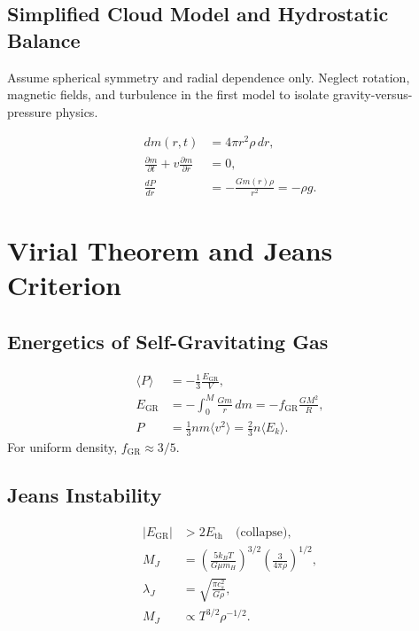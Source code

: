 \subsection{Simplified Cloud Model and Hydrostatic Balance}
\begin{foundation}
Assume spherical symmetry and radial dependence only.
Neglect rotation, magnetic fields, and turbulence in the first model to isolate gravity-versus-pressure physics.
\end{foundation}

\begin{theory}
\begin{align}
    dm(r,t) &= 4\pi r^2\rho\,dr, \\
    \frac{\partial m}{\partial t}+v\frac{\partial m}{\partial r} &= 0, \\
    \frac{dP}{dr} &= -\frac{Gm(r)\rho}{r^2} = -\rho g.
\end{align}
\end{theory}

\section{Virial Theorem and Jeans Criterion}

\subsection{Energetics of Self-Gravitating Gas}
\begin{theory}
\begin{align}
    \langle P\rangle &= -\frac{1}{3}\frac{E_{\text{GR}}}{V}, \\
    E_{\text{GR}} &= -\int_0^M \frac{Gm}{r}\,dm = -f_{\text{GR}}\frac{GM^2}{R}, \\
    P &= \frac{1}{3}nm\langle v^2\rangle = \frac{2}{3}n\langle E_k\rangle.
\end{align}
For uniform density, $f_{\text{GR}}\approx 3/5$.
\end{theory}

\subsection{Jeans Instability}
\begin{theory}
\begin{align}
    |E_{\text{GR}}| &> 2E_{\text{th}} \quad \text{(collapse)}, \\
    M_J &= \left(\frac{5k_B T}{G\mu m_H}\right)^{3/2}\left(\frac{3}{4\pi\rho}\right)^{1/2}, \\
    \lambda_J &= \sqrt{\frac{\pi c_s^2}{G\rho}}, \\
    M_J &\propto T^{3/2}\rho^{-1/2}.
\end{align}
\end{theory}

